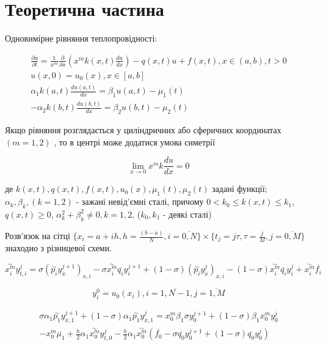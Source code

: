 \documentclass[14pt,a4paper]{scrartcl}
\begin{document}
\section{Теоретична частина}

Одновимірне рівняння теплопровідності:


\begin{gather}
		\frac{\partial u}{\partial t} = \frac{1}{x^m} \frac{\partial}{\partial x} \left( x^{m} k(x,t) \frac{du}{dx} \right) - q(x,t)u + f(x,t), x \in (a,b), t > 0 \label{eq1}\\
		u(x,0) = u_{0}(x), x\in [a,b] \label{eq2}\\
		\alpha_{1}k(a,t) \frac{du(a,t)}{dx} = \beta_{1} u(a,t) - \mu_{1}(t) \label{eq3}\\				-\alpha_{2}k(b,t) \frac{du(b,t)}{dx} = \beta_{2} u(b,t) - \mu_{2}(t) \label{eq4}
\end{gather}

Якщо рівняння розглядається у циліндричних або сферичних координатах $(m=1,2)$ , то в центрі може додатися умова симетрії

\begin{equation}\label{eq5}
	\lim_{x \to 0} x^{m}k \frac{du}{dx} = 0
\end{equation}

де $k(x,t), q(x,t), f(x,t), u_{0}(x), \mu_{1}(t), \mu_{2}(t)$ задані функції; $\alpha_{k}, \beta_{k}, (k= 1,2)$ - зажані невід'ємні сталі, причому $0 < k_{0} \leq k(x,t) \leq k_{1}$, $q(x,t) \geq 0$, $\alpha_{k}^{2} + \beta_{k}^2 \neq 0, k = 1,2$, ($k_0,k_1$ - деякі сталі)

Розв'язок на сітці $\{ x_i = a + ih, h = \frac{(b-a)}{N}, i = \overline{0,N} \} \times \{ t_j = j\tau, \tau= \frac{j}{M}, j = \overline{0,M} \}$ знаходио з різницевої схеми.

\begin{equation}\label{eq6}
	\overset{\sim}{x^{m}_i}y^{j}_{t,i} = \sigma(\overset{\sim}{p_i}y^{j+1}_{\overline{x}})_{x,i} - \sigma \overset{\sim}{x^{m}_i} \overline{q_i}y^{j+1}_{i} + (1- \sigma)(\overset{\sim}{p_i}y^{j}_{\overline{x}} )_{x,i} - (1-\sigma) \overset{\sim}{x^{m}_i}\overline{q_i}y^{j}_{i} + \overset{\sim}{x^{m}_i} \overline{f_i} 
\end{equation}

\begin{equation}\label{eq7}
	y_{i}^{0} = u_{0}(x_i), i = \overline{1,N-1}, j = \overline{1,M}
\end{equation}


\begin{multline} \label{eq8}
	\sigma \alpha_{1} \overset{\sim}{p_1} y^{j+1}_{\overline{x},1} + (1-\sigma)\alpha_{1} \overset{\sim}{p_1} y^{j}_{\overline{x},1} = x_{0}^{m} \beta_{1} \sigma y^{j+1}_{0}  + (1-\sigma) \beta_{1} x_{0}^{m} y_{0}^{j} \\- x_{0}^{m}\overline{\mu_{1}} + \frac{h}{2}\alpha_{1}\overset{\sim}{x^{m}_0} y_{t,0}^{j} - \frac{h}{2} \alpha_{1} \overset{\sim}{x^{m}_0} (\overline{f_0} -\sigma \overline{q_0}y_{0}^{j+1} + (1-\sigma)\overline{q_0} y^{j}_0 )
\end{multline}
\end{document}

